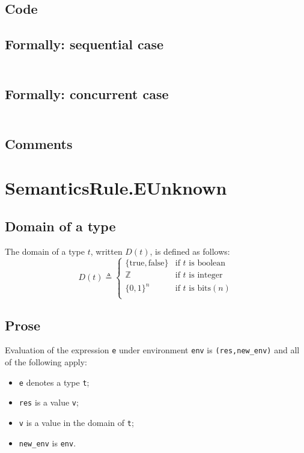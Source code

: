 \documentclass{book}
\begin{document}
  \subsection{Code}

  \subsection{Formally: sequential case}
  \begin{align}
  \end{align} 

  \subsection{Formally: concurrent case}
  \begin{align}
  \end{align} 

  \subsection{Comments}

\section{SemanticsRule.EUnknown \label{sec:SemanticsRule.EUnknown}}

  \subsection{Domain of a type}

  The domain of a type $t$, written $D(t)$, is defined as follows:
  \[
  D(t) \triangleq \left\{
    \begin{array}{ll}
      \{\text{true}, \text{false} \} & \text{if } t \text{ is boolean}  \\
      \mathbb{Z}                     & \text{if } t \text{ is integer}  \\
      {\{0, 1\}}^n                   & \text{if } t \text{ is bits} (n) \\
    \end{array}
  \right.
  \]

  \subsection{Prose}
  Evaluation of the expression \texttt{e} under environment \texttt{env} is
  \texttt{(res,new\_env)} and all of the following apply:
  \begin{itemize}
  \item \texttt{e} denotes a type \texttt{t};
  \item \texttt{res} is a value \texttt{v};
  \item \texttt{v} is a value in the domain of \texttt{t};
  \item \texttt{new\_env} is \texttt{env}.
  \end{itemize}
\end{document}
